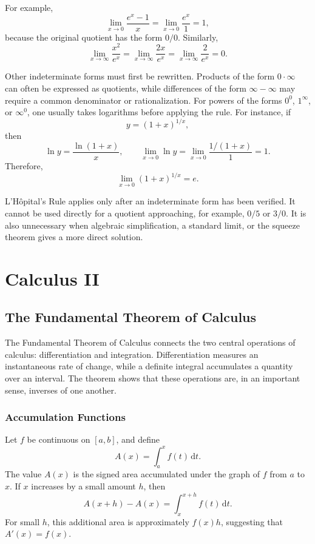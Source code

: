 For example,
\[
    \lim_{x\to0}\frac{e^x-1}{x}
    =\lim_{x\to0}\frac{e^x}{1}=1,
\]
because the original quotient has the form \(0/0\).  Similarly,
\[
    \lim_{x\to\infty}\frac{x^2}{e^x}
    =\lim_{x\to\infty}\frac{2x}{e^x}
    =\lim_{x\to\infty}\frac{2}{e^x}=0.
\]

Other indeterminate forms must first be rewritten.  Products of the form
\(0\cdot\infty\) can often be expressed as quotients, while differences of
the form \(\infty-\infty\) may require a common denominator or
rationalization.  For powers of the forms \(0^0\), \(1^\infty\), or
\(\infty^0\), one usually takes logarithms before applying the rule.  For
instance, if
\[
    y=(1+x)^{1/x},
\]
then
\[
    \ln y=\frac{\ln(1+x)}{x},
    \qquad
    \lim_{x\to0}\ln y
    =\lim_{x\to0}\frac{1/(1+x)}{1}=1.
\]
Therefore,
\[
    \lim_{x\to0}(1+x)^{1/x}=e.
\]

\begin{remark}
    L'H\^{o}pital's Rule applies only after an indeterminate form has been
    verified.  It cannot be used directly for a quotient approaching, for
    example, \(0/5\) or \(3/0\).  It is also unnecessary when algebraic
    simplification, a standard limit, or the squeeze theorem gives a more
    direct solution.
\end{remark}

\chapter{Calculus II}

\section{The Fundamental Theorem of Calculus}

The Fundamental Theorem of Calculus connects the two central operations of
calculus: differentiation and integration.  Differentiation measures an
instantaneous rate of change, while a definite integral accumulates a
quantity over an interval.  The theorem shows that these operations are, in
an important sense, inverses of one another.

\subsection{Accumulation Functions}

Let \(f\) be continuous on \([a,b]\), and define
\[
    A(x)=\int_a^x f(t)\,\mathrm{d}t.
\]
The value \(A(x)\) is the signed area accumulated under the graph of \(f\)
from \(a\) to \(x\).  If \(x\) increases by a small amount \(h\), then
\[
    A(x+h)-A(x)=\int_x^{x+h}f(t)\,\mathrm{d}t.
\]
For small \(h\), this additional area is approximately \(f(x)h\), suggesting
that \(A'(x)=f(x)\).

